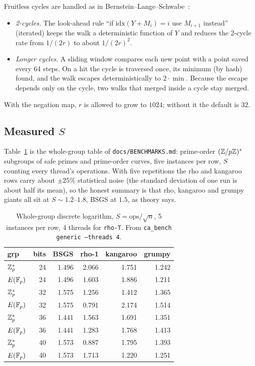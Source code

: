 Fruitless cycles are handled as in Bernstein--Lange--Schwabe~\cite{bls2011}:
\begin{itemize}[leftmargin=1.2em]
\item \emph{2-cycles.} The look-ahead rule ``if $\mathrm{idx}(Y+M_i)=i$
  use $M_{i+1}$ instead'' (iterated) keeps the walk a deterministic
  function of $Y$ and reduces the 2-cycle rate from $1/(2r)$ to about
  $1/(2r)^2$.
\item \emph{Longer cycles.} A sliding window compares each new point
  with a point saved every 64 steps. On a hit the cycle is traversed
  once, its minimum (by hash) found, and the walk escapes
  deterministically to $2\cdot\min$. Because the escape depends only
  on the cycle, two walks that merged inside a cycle stay merged.
\end{itemize}
With the negation map, $r$ is allowed to grow to $1024$; without it
the default is $32$.

\subsection{Measured $S$}
\label{sec:rho-S}

Table~\ref{tab:rho-s} is the whole-group table of
\texttt{docs/BENCHMARKS.md}: prime-order $(\mathbb{Z}/p\mathbb{Z})^*$ subgroups of
safe primes and prime-order curves, five instances per row, $S$
counting every thread's operations. With five repetitions the rho and
kangaroo rows carry about $\pm 25\%$ statistical noise (the standard
deviation of one run is about half its mean), so the honest summary is
that rho, kangaroo and grumpy giants all sit at $S\sim 1.2$--$1.8$,
BSGS at $1.5$, as theory says.

\begin{table}[t]
\centering
\small
\caption{Whole-group discrete logarithm, $S=\mathrm{ops}/\sqrt{n}$,
  5 instances per row, 4 threads for \texttt{rho-T}. From
  \texttt{ca\_bench generic --threads 4}.}
\label{tab:rho-s}
\begin{tabular}{@{}lrrrrr@{}}
\toprule
grp & bits & BSGS & rho-1 & kangaroo & grumpy \\
\midrule
$\mathbb{Z}_p^*$ & 24 & 1.496 & 2.066 & 1.751 & 1.242 \\
$E(\mathbb{F}_p)$ & 24 & 1.496 & 1.603 & 1.886 & 1.211 \\
$\mathbb{Z}_p^*$ & 32 & 1.575 & 1.256 & 1.412 & 1.365 \\
$E(\mathbb{F}_p)$ & 32 & 1.575 & 0.791 & 2.174 & 1.514 \\
$\mathbb{Z}_p^*$ & 36 & 1.441 & 1.563 & 1.691 & 1.351 \\
$E(\mathbb{F}_p)$ & 36 & 1.441 & 1.283 & 1.768 & 1.413 \\
$\mathbb{Z}_p^*$ & 40 & 1.573 & 0.887 & 1.795 & 1.393 \\
$E(\mathbb{F}_p)$ & 40 & 1.573 & 1.713 & 1.220 & 1.251 \\
\bottomrule
\end{tabular}
\end{table}

